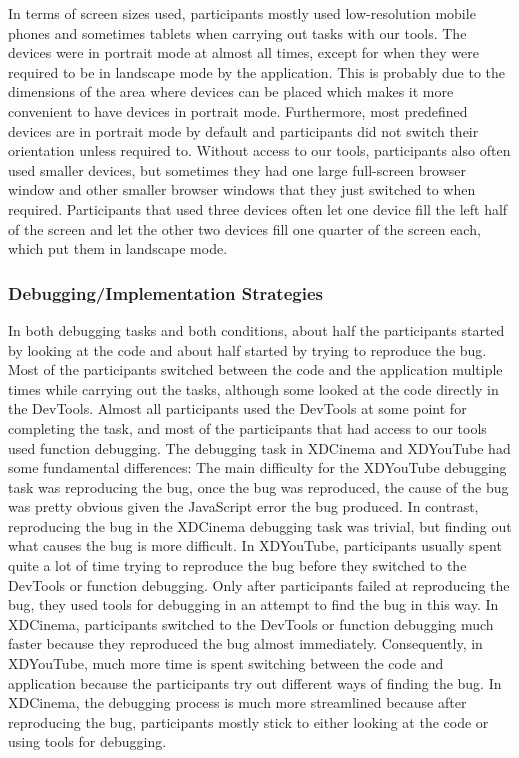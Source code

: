 In terms of screen sizes used, participants mostly used low-resolution mobile phones and sometimes tablets when carrying out tasks with our tools. The devices were in portrait mode at almost all times, except for when they were required to be in landscape mode by the application. This is probably due to the dimensions of the area where devices can be placed which makes it more convenient to have devices in portrait mode. Furthermore, most predefined devices are in portrait mode by default and participants did not switch their orientation unless required to. Without access to our tools, participants also often used smaller devices, but sometimes they had one large full-screen browser window and other smaller browser windows that they just switched to when required. Participants that used three devices often let one device fill the left half of the screen and let the other two devices fill one quarter of the screen each, which put them in landscape mode. 

\subsubsection{Debugging/Implementation Strategies}

In both debugging tasks and both conditions, about half the participants started by looking at the code and about half started by trying to reproduce the bug. Most of the participants switched between the code and the application multiple times while carrying out the tasks, although some looked at the code directly in the DevTools. Almost all participants used the DevTools at some point for completing the task, and most of the participants that had access to our tools used function debugging. The debugging task in XDCinema and XDYouTube had some fundamental differences: The main difficulty for the XDYouTube debugging task was reproducing the bug, once the bug was reproduced, the cause of the bug was pretty obvious given the JavaScript error the bug produced. In contrast, reproducing the bug in the XDCinema debugging task was trivial, but finding out what causes the bug is more difficult. In XDYouTube, participants usually spent quite a lot of time trying to reproduce the bug before they switched to the DevTools or function debugging. Only after participants failed at reproducing the bug, they used tools for debugging in an attempt to find the bug in this way. In XDCinema, participants switched to the DevTools or function debugging much faster because they reproduced the bug almost immediately. Consequently, in XDYouTube, much more time is spent switching between the code and application because the participants try out different ways of finding the bug. In XDCinema, the debugging process is much more streamlined because after reproducing the bug, participants mostly stick to either looking at the code or using tools for debugging.

